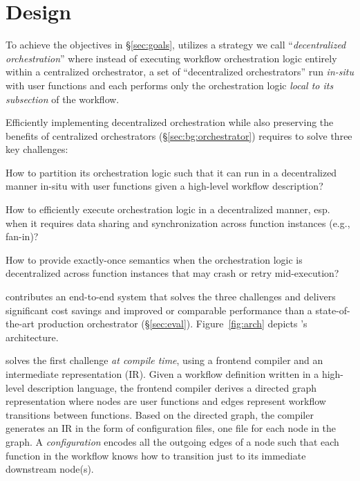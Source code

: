 \section{Design}

To achieve the objectives in \S\ref{sec:goals}, \name{} utilizes a strategy we
call ``\emph{decentralized orchestration}'' where instead of executing
workflow orchestration logic entirely within a centralized orchestrator, a set
of ``decentralized orchestrators'' run \emph{in-situ} with user functions and
each performs only the orchestration logic \emph{local to its subsection} of
the workflow.

Efficiently implementing decentralized orchestration while also preserving the
benefits of centralized orchestrators (\S\ref{sec:bg:orchestrator}) requires
\name{} to solve three key challenges:

\squishenum
	\item How to partition its orchestration logic such that it can run in a
	decentralized manner in-situ with user functions given a high-level workflow description?

	\item How to efficiently execute orchestration logic in a
	decentralized manner, esp. when it requires data sharing and
	synchronization across function instances (e.g., fan-in)?

	\item How to provide exactly-once semantics when the
	orchestration logic is decentralized across function instances that may
	crash or retry mid-execution?
\squishenumend

\name{} contributes an end-to-end system that solves the three challenges and
delivers significant cost savings and improved or comparable performance than
a state-of-the-art production orchestrator (\S\ref{sec:eval}).
Figure~\ref{fig:arch} depicts \name{}'s architecture. 

\name{} solves the first challenge \emph{at compile time}, using a frontend
compiler and an intermediate representation (IR). Given a workflow definition
written in a high-level description language, the frontend compiler derives a
directed graph representation where nodes are user functions and edges
represent workflow transitions between functions. Based on the directed graph,
the compiler generates an IR in the form of configuration files, one file for
each node in the graph. A \textit{\name{} configuration} encodes all the outgoing edges
of a node such that each function in the workflow knows how to transition just
to its immediate downstream node(s).

